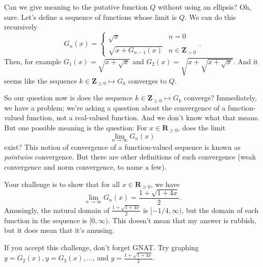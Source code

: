 \documentclass[12pt,fleqn,answers]{exam}
\newcommand{\reals}{\mathbf{R}}
\newcommand{\integers}{\mathbf{Z}}
\begin{document}
\begin{questions}
\quad Can we give meaning to the putative function $Q$ without using an ellipsis?  Oh, sure.  Let's define a sequence of functions whose limit
is $Q$.  We can do this recursively
\begin{equation*}
   G_{n}(x) = \begin{cases}  \sqrt{x}  & n = 0 \\ \sqrt{x + G_{n-1}(x)}  & n \in \integers_{> 0} \end{cases}.
\end{equation*}
Then, for example $G_1(x) = \sqrt{x+\sqrt{x}}$ and $G_2(x) = \sqrt{x+\sqrt{x + \sqrt{x}}}$.   And it seems like
the sequence $k \in \integers_{\geq 0} \mapsto G_k$ converges to $Q$.

\quad So our question now is does the sequence $k \in \integers_{\geq 0} \mapsto G_k$ converge?  Immediately, we have a problem; we're asking a 
question about the convergence of a function-valued function, not a real-valued function.  And we don't know what that means.  But one 
possible meaning is the question:  For $x \in \reals_{\geq 0}$, does the limit
\begin{equation*}
      \lim_{n \to \infty} G_n(x) 
\end{equation*}
exist?  This notion of convergence of a function-valued sequence is known as \emph{pointwise} convergence.  But there are other definitions
of such convergence (weak convergence and norm convergence, to name a few).

\quad Your challenge is to show that for all $x \in \reals_{\geq 0}$, we have 
\begin{equation*}
      \lim_{n \to \infty} G_n(x)  = \frac{1 + \sqrt{1 + 4 x}}{2}.
\end{equation*}
Amusingly, the natural domain of $\frac{1 + \sqrt{1 + 4 x}}{2}$ is $[-1/4, \infty)$, but the domain of each function in the sequence is $[0,\infty)$.
This doesn't mean that my answer is rubbish, but it does mean that it's amusing. 

\quad If you accept this challenge, don't forget GNAT.  Try graphing $y = G_2(x), y = G_3(x), \dots$, and $y = \frac{1 + \sqrt{1 + 4 x}}{2}$.


  


\end{questions}
\end{document}
